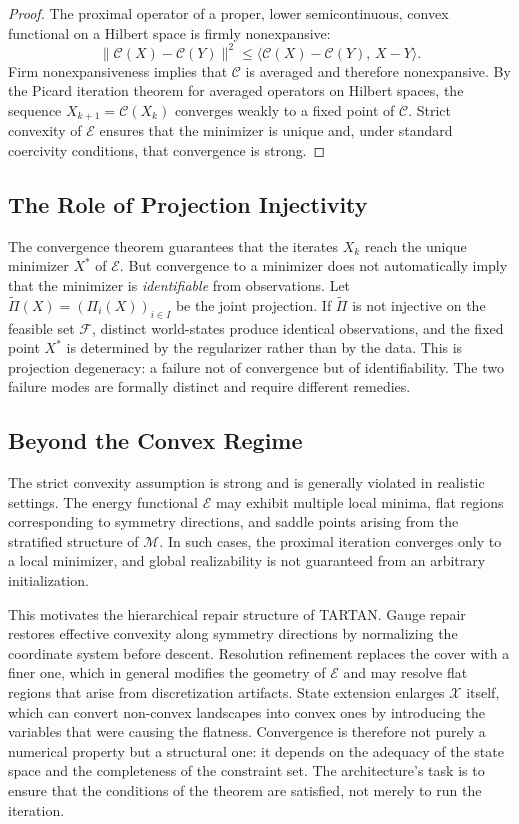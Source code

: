 \documentclass[11pt, oneside]{article}
\begin{document}
\begin{proof}
The proximal operator of a proper, lower semicontinuous, convex functional on a Hilbert space is firmly nonexpansive:
\[
\|\mathcal{C}(X) - \mathcal{C}(Y)\|^2 \leq \langle \mathcal{C}(X) - \mathcal{C}(Y),\, X - Y \rangle.
\]
Firm nonexpansiveness implies that $\mathcal{C}$ is averaged and therefore nonexpansive. By the Picard iteration theorem for averaged operators on Hilbert spaces, the sequence $X_{k+1} = \mathcal{C}(X_k)$ converges weakly to a fixed point of $\mathcal{C}$. Strict convexity of $\mathcal{E}$ ensures that the minimizer is unique and, under standard coercivity conditions, that convergence is strong.
\end{proof}

\subsection{The Role of Projection Injectivity}

The convergence theorem guarantees that the iterates $X_k$ reach the unique minimizer $X^\ast$ of $\mathcal{E}$. But convergence to a minimizer does not automatically imply that the minimizer is \emph{identifiable} from observations. Let $\tilde{\Pi}(X) = (\Pi_i(X))_{i \in I}$ be the joint projection. If $\tilde{\Pi}$ is not injective on the feasible set $\mathcal{F}$, distinct world-states produce identical observations, and the fixed point $X^\ast$ is determined by the regularizer rather than by the data. This is projection degeneracy: a failure not of convergence but of identifiability. The two failure modes are formally distinct and require different remedies.

\subsection{Beyond the Convex Regime}

The strict convexity assumption is strong and is generally violated in realistic settings. The energy functional $\mathcal{E}$ may exhibit multiple local minima, flat regions corresponding to symmetry directions, and saddle points arising from the stratified structure of $\mathcal{M}$. In such cases, the proximal iteration converges only to a local minimizer, and global realizability is not guaranteed from an arbitrary initialization.

This motivates the hierarchical repair structure of TARTAN. Gauge repair restores effective convexity along symmetry directions by normalizing the coordinate system before descent. Resolution refinement replaces the cover with a finer one, which in general modifies the geometry of $\mathcal{E}$ and may resolve flat regions that arise from discretization artifacts. State extension enlarges $\mathcal{X}$ itself, which can convert non-convex landscapes into convex ones by introducing the variables that were causing the flatness. Convergence is therefore not purely a numerical property but a structural one: it depends on the adequacy of the state space and the completeness of the constraint set. The architecture's task is to ensure that the conditions of the theorem are satisfied, not merely to run the iteration.
\end{document}
